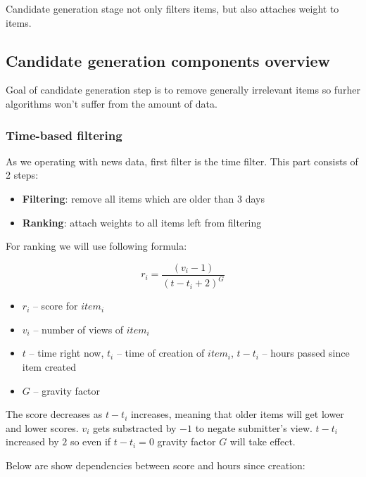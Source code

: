 \documentclass{article}
\begin{document}
    Candidate generation stage not only filters items, but also attaches weight to items.

    \subsection{Candidate generation components overview}

    Goal of candidate generation step is to remove generally irrelevant items so furher algorithms won't suffer from the amount of data.

    \subsubsection{Time-based filtering}

    As we operating with news data, first filter is the time filter. This part consists of 2 steps:

    \begin{itemize}
        \item \textbf{Filtering}: remove all items which are older than 3 days
        \item \textbf{Ranking}: attach weights to all items left from filtering
    \end{itemize}

    For ranking we will use following formula:

    $$r_i = \frac{(v_i - 1)}{(t - t_i + 2)^G}$$


    \begin{itemize}
        \item $r_i$ -- score for $item_i$
        \item $v_i$ -- number of views of $item_i$
        \item $t$ -- time right now, $t_i$ -- time of creation of $item_i$, $t - t_i$ -- hours passed since item created
        \item $G$ -- gravity factor
    \end{itemize}

    The score decreases as $t - t_i$ increases, meaning that older items will get lower and lower scores. $v_i$ gets substracted by $-1$ to negate submitter's view. $t - t_i$ increased by $2$ so even if $t - t_i = 0$ gravity factor $G$ will take effect.


    Below are show dependencies between score and hours since creation:
\end{document}
